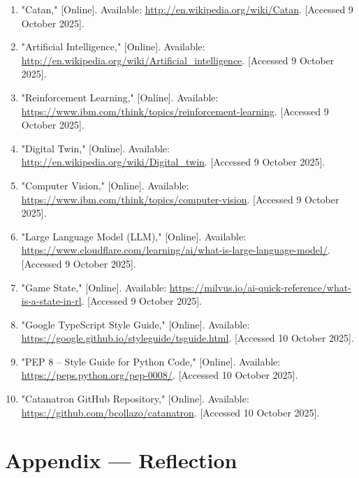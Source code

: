 \documentclass{article}
\begin{document}
\begin{enumerate}
    \item "Catan," [Online]. Available: \url{http://en.wikipedia.org/wiki/Catan}. [Accessed 9 October 2025].
    \item "Artificial Intelligence," [Online]. Available: \url{http://en.wikipedia.org/wiki/Artificial_intelligence}. [Accessed 9 October 2025].
    \item "Reinforcement Learning," [Online]. Available: \url{https://www.ibm.com/think/topics/reinforcement-learning}. [Accessed 9 October 2025].
    \item "Digital Twin," [Online]. Available: \url{http://en.wikipedia.org/wiki/Digital_twin}. [Accessed 9 October 2025].
    \item "Computer Vision," [Online]. Available: \url{https://www.ibm.com/think/topics/computer-vision}. [Accessed 9 October 2025].
    \item "Large Language Model (LLM)," [Online]. Available: \url{https://www.cloudflare.com/learning/ai/what-is-large-language-model/}. [Accessed 9 October 2025].
    \item "Game State," [Online]. Available: \url{https://milvus.io/ai-quick-reference/what-is-a-state-in-rl}. [Accessed 9 October 2025].
    \item "Google TypeScript Style Guide," [Online]. Available: \url{https://google.github.io/styleguide/tsguide.html}. [Accessed 10 October 2025].
    \item "PEP 8 -- Style Guide for Python Code," [Online]. Available: \url{https://peps.python.org/pep-0008/}. [Accessed 10 October 2025].
    \item "Catanatron GitHub Repository," [Online]. Available: \url{https://github.com/bcollazo/catanatron}. [Accessed 10 October 2025].
\end{enumerate}
\newpage{}

\section*{Appendix --- Reflection}

\end{document}
